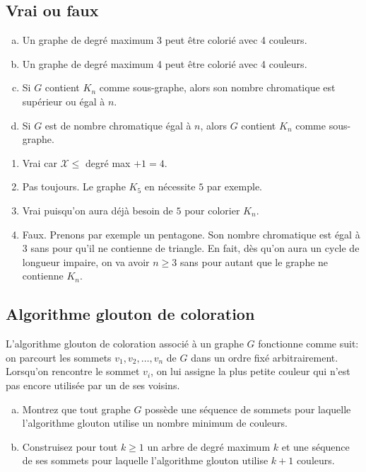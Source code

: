 \subsection{Vrai ou faux}

\begin{enumerate}[(a)]
  \item Un graphe de degré maximum 3 peut être colorié avec 4 couleurs.
  \item Un graphe de degré maximum 4 peut être colorié avec 4 couleurs.
  \item Si $G$ contient $K_n$ comme sous-graphe, alors son nombre chromatique est supérieur ou égal à $n$.
  \item Si $G$ est de nombre chromatique égal à $n$, alors $G$ contient $K_n$ comme sous-graphe.
\end{enumerate}

\begin{solution}
  \begin{enumerate}
    \item Vrai car $\mathcal{X} \leq$ degré max $+ 1 = 4$. 
    \item  Pas toujours. Le graphe $K_5$ en nécessite $5$ par exemple.
    \item Vrai puisqu'on aura déjà besoin de $5$ pour colorier $K_n$.
    \item Faux. Prenons par exemple un pentagone. Son nombre chromatique est égal à $3$ sans pour qu'il ne contienne de triangle. En fait, dès qu'on aura un cycle de longueur impaire, on va avoir $n \geq 3 $ sans pour autant que le graphe ne contienne $K_n$.
  \end{enumerate}
\end{solution}

\subsection{Algorithme glouton de coloration} 
L'algorithme glouton de coloration associé à un graphe $G$ fonctionne comme suit: on parcourt les sommets $v_1,v_2,…,v_n$ de $G$ dans un ordre fixé arbitrairement. Lorsqu'on rencontre le sommet $v_i$, on lui assigne la plus petite couleur qui n'est pas encore utilisée par un de ses voisins.

\begin{enumerate}[(a)]
  \item Montrez que tout graphe $G$ possède une séquence de sommets pour laquelle l'algorithme glouton utilise un nombre minimum de couleurs.
  \item Construisez pour tout $k \geq 1$ un arbre de degré maximum $k$ et une séquence de ses sommets pour laquelle l'algorithme glouton utilise $k+1$ couleurs.
\end{enumerate}

